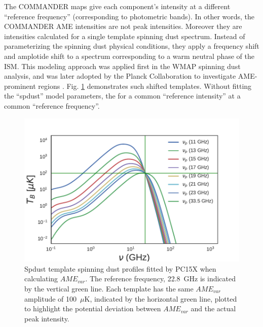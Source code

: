         The COMMANDER maps give each component's intensity at a different ``reference frequency'' (corresponding to photometric bands). In other words, the COMMANDER AME intensities are not peak intensities. Moreover they are intensities calculated for a single template spinning dust spectrum. Instead of parameterizing the spinning dust physical conditions, they apply a frequency shift and amplotide shift to a spectrum corresponding to a warm neutral phase of the ISM. This modeling approach was applied first in the WMAP spinning dust analysis, and was later adopted by the Planck Collaboration to investigate AME-prominent regions \citep{planckXV}. Fig. \ref{fig:AME_commander_freqshift_templ} demonstrates such shifted templates. Without fitting the ``spdust'' model parameters, the  for a common ``reference intensity'' at a common ``reference frequency''.

        \begin{figure}
          \includegraphics[width=\textwidth]{../Plots/ch_datasources/AME_commander_freqshift_templ.pdf}
          \centering
          \caption{Spdust template spinning dust profiles fitted by PC15X when calculating $AME_{var}$.  The reference frequency, 22.8~GHz is indicated by the vertical green line. Each template has the same $AME_{var}$ amplitude of 100~$\mu$K, indicated by the horizontal green line, plotted to highlight the potential deviation between $AME_{var}$ and the actual peak intensity. }
          \label{fig:AME_commander_freqshift_templ}
      \end{figure}

